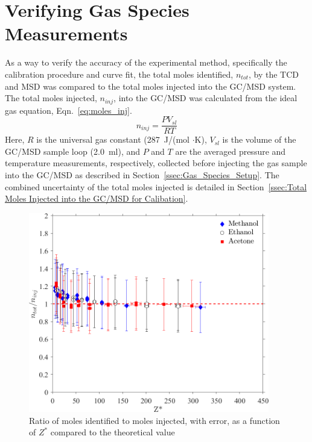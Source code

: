 \documentclass[12pt]{article}
\begin{document}
\clearpage

\section{Verifying Gas Species Measurements}
\label{ssec:Verifying_Vol_Frac_Measurements}

As a way to verify the accuracy of the experimental method, specifically the calibration procedure and curve fit, the total moles identified, $n_{tot}$, by the TCD and MSD was compared to the total moles injected into the GC/MSD system. The total moles injected, $n_{inj}$, into the GC/MSD was calculated from the ideal gas equation, Eqn.~\ref{eq:moles_inj}.
\begin{equation}\label{eq:moles_inj}
n_{inj}=\frac{PV_{sl}}{RT}
\end{equation}
Here, $R$ is the universal gas constant (287~J/(mol $\cdot$K), $V_{sl}$ is the volume of the GC/MSD sample loop (\SI{2.0}{ml}), and $P$ and $T$ are the averaged pressure and temperature measurements, respectively, collected before injecting the gas sample into the GC/MSD as described in Section~\ref{ssec:Gas_Species_Setup}. The combined uncertainty of the total moles injected is detailed in Section~\ref{ssec:Total Moles Injected into the GC/MSD for Calibation}.

\begin{figure}[h!]
	\centering
\includegraphics[width=10.5cm,keepaspectratio]{mole_ratio_Comparison.png}
	\caption[Ratio of moles identified to moles injected, with error, as a function of $Z^{*}$]{Ratio of moles identified to moles injected, with error, as a function of $Z^{*}$ compared to the theoretical value}
	\label{fig:Mole_Comp}
\end{figure}
\end{document}
